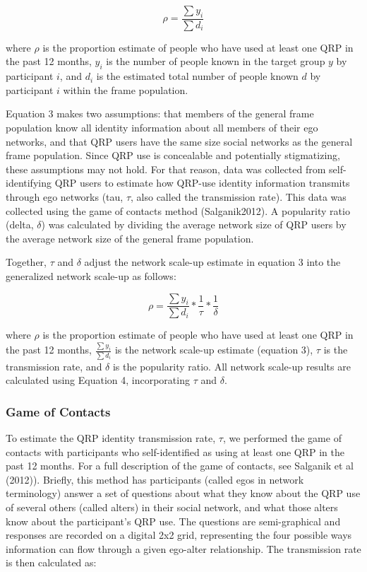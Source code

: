 \documentclass[,jou]{apa6}
\theoremstyle{definition}
\theoremstyle{definition}
\theoremstyle{definition}
\theoremstyle{remark}
\begin{document}
\begin{equation}
\rho = \frac{\sum y_i}{\sum d_i}
\end{equation}

where \(\rho\) is the proportion estimate of people who have used at
least one QRP in the past 12 months, \(y_i\) is the number of people
known in the target group \(y\) by participant \(i\), and \(d_i\) is the
estimated total number of people known \(d\) by participant \(i\) within
the frame population.

Equation 3 makes two assumptions: that members of the general frame
population know all identity information about all members of their ego
networks, and that QRP users have the same size social networks as the
general frame population. Since QRP use is concealable and potentially
stigmatizing, these assumptions may not hold. For that reason, data was
collected from self-identifying QRP users to estimate how QRP-use
identity information transmits through ego networks (tau, \(\tau\), also
called the transmission rate). This data was collected using the game of
contacts method (Salganik2012). A popularity ratio (delta, \(\delta\))
was calculated by dividing the average network size of QRP users by the
average network size of the general frame population.

Together, \(\tau\) and \(\delta\) adjust the network scale-up estimate
in equation 3 into the generalized network scale-up as follows:

\begin{equation}
\rho = \frac{\sum y_i}{\sum d_i} * \frac{1}{\tau} * \frac{1}{\delta}
\end{equation}

where \(\rho\) is the proportion estimate of people who have used at
least one QRP in the past 12 months, \(\frac{\sum y_i}{\sum d_i}\) is
the network scale-up estimate (equation 3), \(\tau\) is the transmission
rate, and \(\delta\) is the popularity ratio. All network scale-up
results are calculated using Equation 4, incorporating \(\tau\) and
\(\delta\).

\subsubsection{Game of Contacts}\label{game-of-contacts}

To estimate the QRP identity transmission rate, \(\tau\), we performed
the game of contacts with participants who self-identified as using at
least one QRP in the past 12 months. For a full description of the game
of contacts, see Salganik et al (2012)). Briefly, this method has
participants (called egos in network terminology) answer a set of
questions about what they know about the QRP use of several others
(called alters) in their social network, and what those alters know
about the participant's QRP use. The questions are semi-graphical and
responses are recorded on a digital 2x2 grid, representing the four
possible ways information can flow through a given ego-alter
relationship. The transmission rate is then calculated as:
\end{document}
